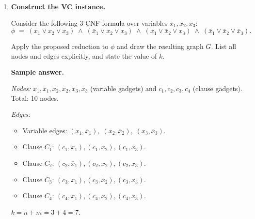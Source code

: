 \documentclass[11pt]{article}
\begin{document}
\begin{enumerate}[leftmargin=0pt, itemindent=1.7em, itemsep=1.2em]

\item \textbf{Construct the VC instance.}

Consider the following 3-CNF formula over variables $x_1, x_2, x_3$:
\[
  \phi \;=\;
  (x_1 \vee x_2 \vee x_3)
  \;\wedge\;
  (\bar{x}_1 \vee x_2 \vee x_3)
  \;\wedge\;
  (x_1 \vee \bar{x}_2 \vee x_3)
  \;\wedge\;
  (\bar{x}_1 \vee \bar{x}_2 \vee \bar{x}_3).
\]

Apply the proposed reduction to $\phi$ and draw the resulting graph $G$. List all nodes and edges explicitly, and state the value of $k$.

\vspace{9.5cm}

\ifanswers
\textbf{Sample answer.}

\medskip
\noindent
\textit{Nodes:} $x_1,\bar{x}_1,x_2,\bar{x}_2,x_3,\bar{x}_3$ (variable gadgets) and $c_1,c_2,c_3,c_4$ (clause gadgets). Total: 10 nodes.

\noindent
\textit{Edges:}
\begin{itemize}
  \item Variable edges: $(x_1,\bar{x}_1),\;(x_2,\bar{x}_2),\;(x_3,\bar{x}_3)$.
  \item Clause $C_1$: $(c_1,x_1),(c_1,x_2),(c_1,x_3)$.
  \item Clause $C_2$: $(c_2,\bar{x}_1),(c_2,x_2),(c_2,x_3)$.
  \item Clause $C_3$: $(c_3,x_1),(c_3,\bar{x}_2),(c_3,x_3)$.
  \item Clause $C_4$: $(c_4,\bar{x}_1),(c_4,\bar{x}_2),(c_4,\bar{x}_3)$.
\end{itemize}

\noindent
$k = n + m = 3 + 4 = 7$.

\medskip
\begin{center}
\end{center}
\end{enumerate}
\end{document}
